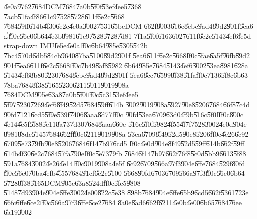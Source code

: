 \U{4e0a}\U{9762}\U{7684}DCM\U{7684}\U{7a0b}\U{5f0f}\U{53ef}\U{4ee5}\U{7368}%
\U{7acb}\U{51fa}\U{4f86}\U{61c9}\U{7528}\U{5728}\U{611f}\U{6e2c}\U{5668}%
\U{7684}\U{59ff}\U{614b}\U{4f30}\U{6e2c}\U{4e0a}\U{3002}\U{7531}\U{65bc}DCM%
\U{662f}\U{8003}\U{616e}\U{8cbc}\U{9ad4}\U{89d2}\U{901f}\U{5ea6}$\vec{\omega}
$\U{ff0c}\U{56e0}\U{6b64}\U{4e3b}\U{8981}\U{61c9}\U{7528}\U{5728}\U{7d81}%
\U{7f1a}\U{5f0f}\U{6163}\U{6027}\U{611f}\U{6e2c}\U{5143}\U{4ef6}\U{fe5d}%
strap-down IMU\U{fe5e}\U{4e0a}\U{ff0c}\U{6b64}\U{985e}\U{5305}\U{542b}%
\U{7bc4}\U{570d}\U{6db5}\U{84cb}\U{9640}\U{87ba}\U{5100}\U{89d2}\U{901f}%
\U{5ea6}\U{611f}\U{6e2c}\U{5668}\U{ff0c}\U{5fae}\U{6a5f}\U{96fb}\U{89d2}%
\U{901f}\U{5ea6}\U{611f}\U{6e2c}\U{5668}\U{ff0c}\U{7b49}\U{8af8}\U{5982}%
\U{6b64}\U{985e}\U{7684}\U{5143}\U{4ef6}\U{3002}\U{53ea}\U{8981}\U{628a}%
\U{5143}\U{4ef6}\U{8b80}\U{5230}\U{7684}\U{8cbc}\U{9ad4}\U{89d2}\U{901f}%
\U{5ea6}\U{8cc7}\U{6599}\U{8f38}\U{51fa}\U{ff0c}\U{7136}\U{5f8c}\U{6b63}%
\U{78ba}\U{7684}\U{8f38}\U{5165}\U{5230}\U{6211}\U{5011}\U{9019}\U{908a}%
\U{7684}DCM\U{905e}\U{63a8}\U{7a0b}\U{5f0f}\U{ff0c}\U{5c31}\U{53ef}\U{4ee5}%
\U{5f97}\U{5230}\U{7269}\U{4ef6}\U{8f49}\U{52d5}\U{7684}\U{59ff}\U{614b}%
\U{3002}\U{9019}\U{908a}\U{5927}\U{90e8}\U{5206}\U{7684}\U{66f8}\U{7c4d}%
\U{90fd}\U{7121}\U{6cd5}\U{5f9e}\U{539f}\U{7406}\U{8aaa}\U{8d77}\U{ff0c}%
\U{90fd}\U{53ea}\U{6709}\U{63d0}\U{4f9b}\U{516c}\U{5f0f}\U{ff0c}\U{800c}%
\U{4e14}\U{4e5f}\U{5f88}\U{5c11}\U{8a73}\U{7d30}\U{7684}\U{8aaa}\U{660e}%
\U{516c}\U{5f0f}\U{5982}\U{4f55}\U{4f7f}\U{7528}\U{3002}\U{4e0d}\U{904e}%
\U{8981}\U{88dc}\U{5145}\U{7684}\U{662f}\U{ff0c}\U{6211}\U{9019}\U{908a}%
\U{53ea}\U{6709}\U{8f49}\U{52d5}\U{90e8}\U{5206}\U{ff0c}\U{4e26}\U{6c92}%
\U{6709}\U{5e73}\U{79fb}\U{90e8}\U{5206}\U{7684}\U{6f14}\U{7b97}\U{6cd5}%
\U{ff0c}\U{4e0d}\U{904e}\U{8f49}\U{52d5}\U{59ff}\U{614b}\U{662f}\U{59ff}%
\U{614b}\U{4f30}\U{6e2c}\U{7684}\U{57fa}\U{790e}\U{ff0c}\U{5e73}\U{79fb}%
\U{7684}\U{6f14}\U{7b97}\U{662f}\U{76f8}\U{5c0d}\U{5bb9}\U{6613}\U{5f88}%
\U{591a}\U{7684}\U{3002}\U{4e26}\U{4e14}\U{ff0c}\U{9019}\U{908a}\U{4e5f}%
\U{6c92}\U{6709}\U{566a}\U{97f3}\U{904e}\U{6ffe}\U{7684}\U{529f}\U{80fd}%
\U{ff0c}\U{56e0}\U{70ba}\U{4efb}\U{4f55}\U{7684}\U{91cf}\U{6e2c}\U{5100}%
\U{5668}\U{90fd}\U{6703}\U{6709}\U{566a}\U{97f3}\U{ff0c}\U{56e0}\U{6b64}%
\U{5728}\U{8f38}\U{5165}DCM\U{905e}\U{63a8}\U{524d}\U{ff0c}\U{5fc5}\U{9808}%
\U{5148}\U{7d93}\U{904e}\U{904e}\U{6ffe}\U{3002}\U{4e00}\U{822c}\U{5e38}%
\U{898b}\U{7684}\U{904e}\U{6ffe}\U{65b9}\U{6cd5}\U{662f}\U{5361}\U{723e}%
\U{66fc}\U{6ffe}\U{6ce2}\U{ff0c}\U{566a}\U{97f3}\U{6ffe}\U{6ce2}\U{7684}%
\U{8a0e}\U{8ad6}\U{662f}\U{6211}\U{4e0b}\U{4e00}\U{6b65}\U{7684}\U{76ee}%
\U{6a19}\U{3002}

